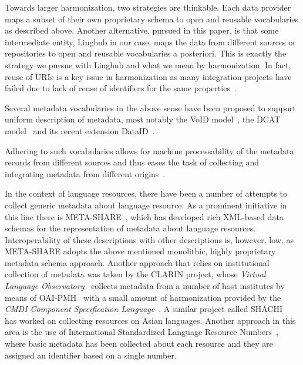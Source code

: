 \documentclass[smallextended]{svjour3}       %
\begin{document}
Towards larger harmonization, two strategies are thinkable. Each data provider
maps a subset of their own proprietary schema to open and reusable vocabularies
as described above. Another alternative, pursued in this paper, is that some
intermediate entity, Linghub in our case, maps the data from different sources
or repositories to open and reusable vocabularies a posteriori.  
This is exactly the strategy we pursue with Linghub and what we mean by
harmonization. In fact, reuse of URIs is a key issue in harmonization as many
integration projects have failed due to lack of reuse of identifiers for the
same properties~\cite{kemps2008isocat}. 

Several metadata vocabularies in the above sense have been proposed to support
uniform description of metadata, most notably the VoID
model~\cite{alexander2011describing}, the
DCAT model~\cite{maali2014data} and its recent extension
DataID~\cite{brummer2014dataid}. 

Adhering to such vocabularies allows for machine processability of the metadata
records from different sources and thus eases the task of collecting and
integrating metadata from different origins~\cite{jenkins1999automatic}. 

In the context of language resources, there have been a number of attempts to
collect generic metadata about language resource. As a prominent initiative in
this line there is 
META-SHARE~\cite{gavrilidou2012meta,piperidis2012meta}, which has developed rich
XML-based data schemas for the representation of metadata about language
resources. Interoperability of these descriptions with other descriptions is,
however, low, as META-SHARE adopts the above mentioned monolithic, highly
proprietary metadata schema approach. Another approach that
relies on institutional collection of metadata was taken by the CLARIN project,
whose \emph{Virtual Language Observatory}~\cite{van2012semantic} collects
metadata from a number of host institutes by means of
OAI-PMH~\cite{sompel2004resource} with a small amount of harmonization provided
by the \emph{CMDI Component 
Specification Language}~\cite{broeder2012cmdi}. A similar project called
SHACHI~\cite{tohyama2008shachi} has worked on collecting resources on Asian
languages. Another approach in this area is the use of International Standardized
Language Resource Numbers~\cite[ISLRN]{choukri2012using}, where basic metadata
has been collected about each resource and they are assigned an identifier based
on a single number. 
\end{document}
